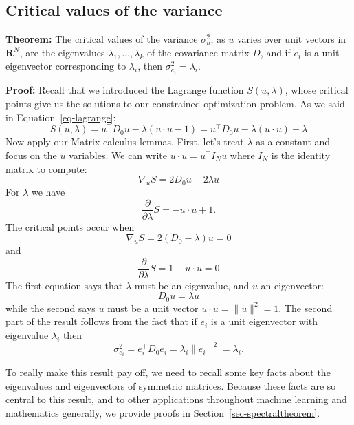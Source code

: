 \documentclass[
  11pt,
  letterpaper,
]{scrbook}
\newcommand{\df}[1]{\frac{\partial}{\partial #1}}
\theoremstyle{plain}
\theoremstyle{plain}
\theoremstyle{remark}
\begin{document}
\hypertarget{sec-critvals}{%
\subsection{Critical values of the variance}\label{sec-critvals}}

\textbf{Theorem:} The critical values of the variance \(\sigma_{u}^2\),
as \(u\) varies over unit vectors in \(\mathbf{R}^{N}\), are the
eigenvalues \(\lambda_{1},\ldots,\lambda_{k}\) of the covariance matrix
\(D\), and if \(e_{i}\) is a unit eigenvector corresponding to
\(\lambda_{i}\), then \(\sigma_{e_{i}}^2 = \lambda_{i}\).

\textbf{Proof:} Recall that we introduced the Lagrange function
\(S(u,\lambda)\), whose critical points give us the solutions to our
constrained optimization problem. As we said in
Equation~\ref{eq-lagrange}: \[
S(u,\lambda) = u^{\intercal}D_{0}u - \lambda(u\cdot u - 1) = u^{\intercal}D_{0}u -\lambda(u\cdot u) + \lambda
\] Now apply our Matrix calculus lemmas. First, let's treat \(\lambda\)
as a constant and focus on the \(u\) variables. We can write
\(u\cdot u = u^{\intercal} I_{N} u\) where \(I_{N}\) is the identity
matrix to compute: \[
\nabla_{u} S = 2D_{0}u -2\lambda u
\] For \(\lambda\) we have \[
\df{\lambda}S = -u\cdot u +1.
\] The critical points occur when \[
\nabla_{u} S = 2(D_{0}-\lambda)u = 0
\] and \[
\df{\lambda}S = 1-u\cdot u = 0
\] The first equation says that \(\lambda\) must be an eigenvalue, and
\(u\) an eigenvector: \[
D_{0}u = \lambda u
\] while the second says \(u\) must be a unit vector
\(u\cdot u=\|u\|^2=1\). The second part of the result follows from the
fact that if \(e_{i}\) is a unit eigenvector with eigenvalue
\(\lambda_{i}\) then \[
\sigma_{e_{i}}^2 = e_{i}^{\intercal}D_{0}e_{i} = \lambda_{i}\|e_{i}\|^2=\lambda_{i}.
\]

To really make this result pay off, we need to recall some key facts
about the eigenvalues and eigenvectors of symmetric matrices. Because
these facts are so central to this result, and to other applications
throughout machine learning and mathematics generally, we provide proofs
in Section~\ref{sec-spectraltheorem}.

\newpage
\end{document}
